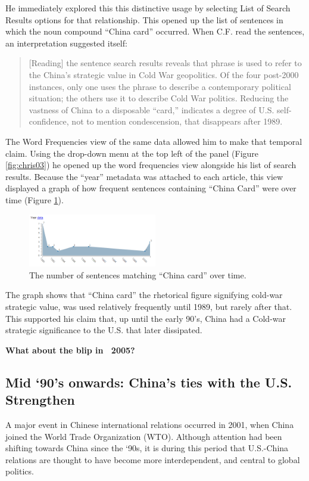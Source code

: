 \documentclass{sig-alternate}
\newcommand{\strong}[1] {\textbf{#1}}
\begin{document}
\begin{enumerate}
He immediately explored this this distinctive usage by selecting List of Search Results options for that relationship.  This opened up the list of sentences in which the noun compound ``China card'' occurred.  When C.F. read the sentences, an interpretation suggested itself:
\begin{quote}
[Reading] the sentence search results reveals that phrase is used to refer to the China's strategic value in Cold War geopolitics. Of the four post-2000 instances, only one uses the phrase to describe a contemporary political situation; the others use it to describe Cold War politics. Reducing the vastness of China to a disposable ``card,'' indicates a degree of U.S. self-confidence, not to mention condescension, that disappears after 1989.
\end{quote}

The Word Frequencies view of the same data allowed him to make that temporal claim. Using the drop-down menu at the top left of the panel (Figure \ref{fig:chris03}) he opened up the word frequencies view alongside his list of search results.  Because the ``year'' metadata was attached to each article, this view displayed a graph of how frequent  sentences containing ``China Card'' were over time (Figure \ref{fig:chris02}). 
\begin{figure}[h!]
\includegraphics[width=0.5\textwidth]{fig/chris/02.png}
\caption{ The number of sentences matching ``China card'' over time. \label{fig:chris02}}
\end{figure}
The graph shows that ``China card'' the rhetorical figure signifying cold-war strategic value, was used relatively frequently until 1989, but rarely  after that. This supported his claim that, up until the early 90's, China had a Cold-war strategic significance to the U.S. that later dissipated.

\strong{What about the blip in ~2005?}

\subsection{Mid `90's onwards: China's ties with the U.S. Strengthen}

A major event in Chinese international relations occurred in 2001, when China joined the World Trade Organization (WTO).  Although attention had been shifting towards China since the `90s, it is during this period that U.S.-China relations are thought to have become more interdependent, and central to global politics. 


\end{enumerate}
\end{document}
